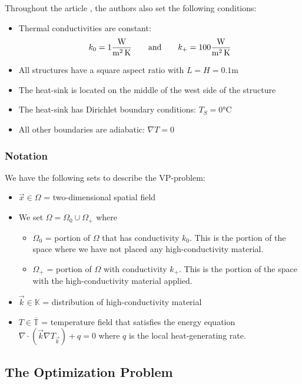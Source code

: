 Throughout the article \cite{Marck2012}, the authors also set the following conditions:
\begin{itemize}
	\item Thermal conductivities are constant:
	$$k_0=1 \si[per-mode=fraction]{\watt\per\square\meter\per\kelvin}\qquad\text{and}\qquad k_+=100 \si[per-mode=fraction]{\watt\per\square\meter\per\kelvin}$$
	\item All structures have a square aspect ratio with $L=H=0.1\si{\meter}$
	\item The heat-sink is located on the middle of the west side of the structure
	\item The heat-sink has Dirichlet boundary conditions: $T_S=0\si{\celsius}$
	\item All other boundaries are adiabatic: $\nabla T=0$
\end{itemize}

\subsubsection*{Notation}

We have the following sets to describe the VP-problem:
\begin{itemize}
	\item $\vec{x}\in\Omega$ = two-dimensional spatial field
	\item[] We set $\Omega = \Omega_0\cup\Omega_+$ where
	\begin{itemize}
		\item $\Omega_0$ = portion of $\Omega$ that has conductivity $k_0$. This is the portion of the space where we have not placed any high-conductivity material.
		\item $\Omega_+$ = portion of $\Omega$ with conductivity $k_+$. This is the portion of the space with the high-conductivity material applied.
	\end{itemize}
	\item $\vec{k}\in\mathbb{K}$ = distribution of high-conductivity material
	\item $T\in\overline{\mathbb{T}}$ = temperature field that satisfies the energy equation $\nabla\cdot\left(\vec{k}\nabla T_{\vec{k}}\right)+q=0$ where $q$ is the local heat-generating rate.
\end{itemize}

\subsection{The Optimization Problem}

